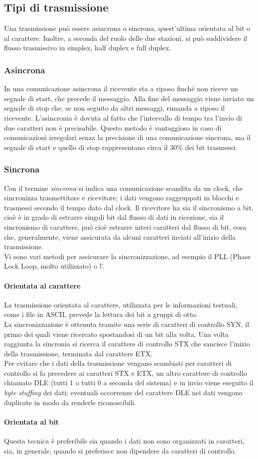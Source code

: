\documentclass[a4paper, twoside]{article}
\def\sub#1{\subsection{#1}\label{#1}}
\def\subsub#1{\subsubsection{#1}\label{#1}}
\def\para#1{\paragraph{#1}\label{#1}}
\def\vedi#1{\nameref{#1}}
\def\italic#1{\textit{#1}}
\begin{document}
\sub{Tipi di trasmissione}
Una trasmissione può essere asincrona o sincrona, quest'ultima orientata al bit o al carattere. Inoltre, a seconda del ruolo delle due stazioni, si può suddividere il flusso trasmissivo in simplex, half duplex e full duplex.
\subsub{Asincrona}
In una comunicazione asincrona il ricevente sta a riposo finché non riceve un segnale di start, che precede il messaggio. Alla fine del messaggio viene inviato un segnale di stop che, se non seguito da altri messaggi, rimanda a riposo il ricevente. L'asincronia è dovuta al fatto che l'intervallo di tempo tra l'invio di due caratteri non è precisabile. Questo metodo è vantaggioso in caso di comunicazioni irregolari senza la precisione di una comunicazione sincrona, ma il segnale di start e quello di stop rappresentano circa il $30\%$ dei bit trasmessi.  
\subsub{Sincrona}
Con il termine \textit{sincrona} si indica una comunicazione scandita da un clock, che sincronizza trasmettitore e ricevitore; i dati vengono raggruppati in blocchi e trasmessi secondo il tempo dato dal clock. Il ricevitore ha sia il sincronismo a bit, cioè è in grado di estrarre singoli bit dal flusso di dati in ricezione, sia il sincronismo di carattere, può cioè estrarre interi caratteri dal flusso di bit, cosa che, generalmente, viene assicurata da alcuni caratteri inviati all'inizio della trasmissione.\\ Vi sono vari metodi per assicurare la sincronizzazione, ad esempio il PLL (Phase Lock Loop, molto utilizzato) o l'\vedi{AMI}.
\para{Orientata al carattere}
La trasmissione orientata al carattere, utilizzata per le informazioni testuali, come i file in ASCII, prevede la lettura dei bit a gruppi di otto. \\La sincronizzazione è ottenuta tramite una serie di caratteri di controllo SYN, il primo dei quali viene ricercato spostandosi di un bit alla volta.
Una volta raggiunta la sincronia si ricerca il carattere di controllo STX che sancisce l'inizio della trasmissione, terminata dal carattere ETX.\\ Per evitare che i dati della trasmissione vengano scambiati per caratteri di controllo si fa precedere ai caratteri STX e ETX, un altro carattere di controllo chiamato DLE (tutti 1 o tutti 0 a seconda del sistema) e in invio viene eseguito il \italic{byte stuffing} dei dati: eventuali occorrenze del carattere DLE nei dati vengono duplicate in modo da renderle riconoscibili.   
\para{Orientata al bit}
Questa tecnica è preferibile sia quando i dati non sono organizzati in caratteri, sia, in generale, quando si preferisce non dipendere da caratteri di controllo.
\end{document}

